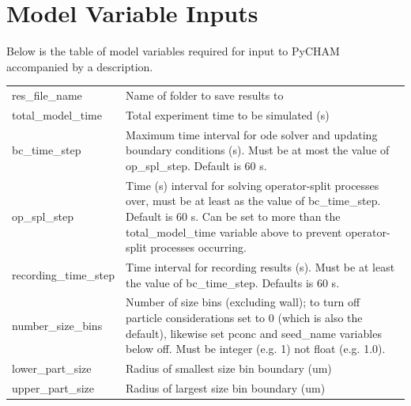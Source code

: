 \documentclass[gmd, manuscript]{copernicus}
\begin{document}
\appendix
\section{Model Variable Inputs}\label{sec:appA}    %

Below is the table of model variables required for input to PyCHAM accompanied by a description. 

\begin{center}
\tablelasttail{\bottomhline}

\begin{supertabular}{p{0.15\textwidth}p{0.75\textwidth}}


res\_file\_name & Name of folder to save results to\\

total\_model\_time & Total experiment time to be simulated (s)\\

bc\_time\_step &  Maximum time interval for ode solver and updating boundary conditions (s).  Must be at most the value of op\_spl\_step.  Default is 60 s.\\

op\_spl\_step &  Time (s) interval for solving operator-split processes over, must be at least as the value of bc\_time\_step.  Default is 60 s.  Can be set to more than the total\_model\_time variable above to prevent operator-split processes occurring.\\

recording\_time\_step &  Time interval for recording results (s).  Must be at least the value of bc\_time\_step.  Defaults is 60 s.\\

number\_size\_bins & Number of size bins (excluding wall); to turn off particle considerations set to 0 (which is also the default), likewise set pconc and seed\_name variables below off.  Must be integer (e.g. 1) not float (e.g. 1.0).\\

lower\_part\_size & Radius of smallest size bin boundary (um)\\

upper\_part\_size & Radius of largest size bin boundary (um)\\


\end{supertabular}
\end{center}
\end{document}
